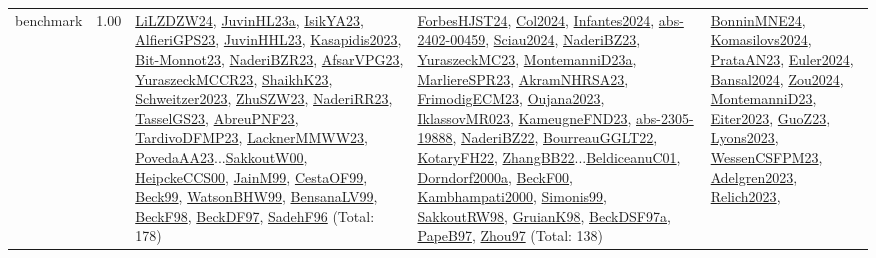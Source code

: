 {\begin{longtable}{p{3cm}r>{\raggedright\arraybackslash}p{6cm}>{\raggedright\arraybackslash}p{6cm}>{\raggedright\arraybackslash}p{8cm}}
\index{benchmark}\index{Benchmarks!benchmark}benchmark &  1.00 & \hyperref[detail:LiLZDZW24]{LiLZDZW24}, \hyperref[detail:JuvinHL23a]{JuvinHL23a}, \hyperref[detail:IsikYA23]{IsikYA23}, \hyperref[detail:AlfieriGPS23]{AlfieriGPS23}, \hyperref[detail:JuvinHHL23]{JuvinHHL23}, \hyperref[detail:Kasapidis2023]{Kasapidis2023}, \hyperref[detail:Bit-Monnot23]{Bit-Monnot23}, \hyperref[detail:NaderiBZR23]{NaderiBZR23}, \hyperref[detail:AfsarVPG23]{AfsarVPG23}, \hyperref[detail:YuraszeckMCCR23]{YuraszeckMCCR23}, \hyperref[detail:ShaikhK23]{ShaikhK23}, \hyperref[detail:Schweitzer2023]{Schweitzer2023}, \hyperref[detail:ZhuSZW23]{ZhuSZW23}, \hyperref[detail:NaderiRR23]{NaderiRR23}, \hyperref[detail:TasselGS23]{TasselGS23}, \hyperref[detail:AbreuPNF23]{AbreuPNF23}, \hyperref[detail:TardivoDFMP23]{TardivoDFMP23}, \hyperref[detail:LacknerMMWW23]{LacknerMMWW23}, \hyperref[detail:PovedaAA23]{PovedaAA23}...\hyperref[detail:SakkoutW00]{SakkoutW00}, \hyperref[detail:HeipckeCCS00]{HeipckeCCS00}, \hyperref[detail:JainM99]{JainM99}, \hyperref[detail:CestaOF99]{CestaOF99}, \hyperref[detail:Beck99]{Beck99}, \hyperref[detail:WatsonBHW99]{WatsonBHW99}, \hyperref[detail:BensanaLV99]{BensanaLV99}, \hyperref[detail:BeckF98]{BeckF98}, \hyperref[detail:BeckDF97]{BeckDF97}, \hyperref[detail:SadehF96]{SadehF96} (Total: 178) & \hyperref[detail:ForbesHJST24]{ForbesHJST24}, \hyperref[detail:Col2024]{Col2024}, \hyperref[detail:Infantes2024]{Infantes2024}, \hyperref[detail:abs-2402-00459]{abs-2402-00459}, \hyperref[detail:Sciau2024]{Sciau2024}, \hyperref[detail:NaderiBZ23]{NaderiBZ23}, \hyperref[detail:YuraszeckMC23]{YuraszeckMC23}, \hyperref[detail:MontemanniD23a]{MontemanniD23a}, \hyperref[detail:MarliereSPR23]{MarliereSPR23}, \hyperref[detail:AkramNHRSA23]{AkramNHRSA23}, \hyperref[detail:FrimodigECM23]{FrimodigECM23}, \hyperref[detail:Oujana2023]{Oujana2023}, \hyperref[detail:IklassovMR023]{IklassovMR023}, \hyperref[detail:KameugneFND23]{KameugneFND23}, \hyperref[detail:abs-2305-19888]{abs-2305-19888}, \hyperref[detail:NaderiBZ22]{NaderiBZ22}, \hyperref[detail:BourreauGGLT22]{BourreauGGLT22}, \hyperref[detail:KotaryFH22]{KotaryFH22}, \hyperref[detail:ZhangBB22]{ZhangBB22}...\hyperref[detail:BeldiceanuC01]{BeldiceanuC01}, \hyperref[detail:Dorndorf2000a]{Dorndorf2000a}, \hyperref[detail:BeckF00]{BeckF00}, \hyperref[detail:Kambhampati2000]{Kambhampati2000}, \hyperref[detail:Simonis99]{Simonis99}, \hyperref[detail:SakkoutRW98]{SakkoutRW98}, \hyperref[detail:GruianK98]{GruianK98}, \hyperref[detail:BeckDSF97a]{BeckDSF97a}, \hyperref[detail:PapeB97]{PapeB97}, \hyperref[detail:Zhou97]{Zhou97} (Total: 138) & \hyperref[detail:BonninMNE24]{BonninMNE24}, \hyperref[detail:Komasilovs2024]{Komasilovs2024}, \hyperref[detail:PrataAN23]{PrataAN23}, \hyperref[detail:Euler2024]{Euler2024}, \hyperref[detail:Bansal2024]{Bansal2024}, \hyperref[detail:Zou2024]{Zou2024}, \hyperref[detail:MontemanniD23]{MontemanniD23}, \hyperref[detail:Eiter2023]{Eiter2023}, \hyperref[detail:GuoZ23]{GuoZ23}, \hyperref[detail:Lyons2023]{Lyons2023}, \hyperref[detail:WessenCSFPM23]{WessenCSFPM23}, \hyperref[detail:Adelgren2023]{Adelgren2023}, \hyperref[detail:Relich2023]{Relich2023}, 
\end{longtable}}
